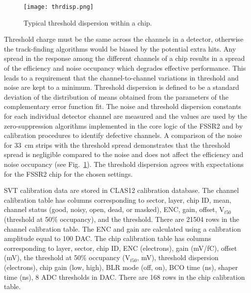 \begin{figure}[hbt] 
	\centering 
	\texttt{[image: thrdisp.png]}
	\caption{Typical threshold dispersion within a chip.}
	\label{fig:thrdisp}
\end{figure}

Threshold charge must be the same across the channels in a detector, otherwise the track-finding algorithms would be biased by the potential extra hits. Any spread in the response among the different channels of a chip results in a spread of the efficiency and noise occupancy which degrades effective performance. This leads to a requirement that the channel-to-channel variations in threshold and noise are kept to a minimum. Threshold dispersion is defined to be a standard deviation of the distribution of means obtained from the parameters of the complementary error function fit. The noise and threshold dispersion constants for each individual detector channel are measured and the values are used by the zero-suppression algorithms implemented in the core logic of the FSSR2 and by calibration procedures to identify defective channels. A comparison of the noise for 33~cm strips with the threshold spread demonstrates that the threshold spread is negligible compared to the noise and does not affect the efficiency and noise occupancy (see Fig.~\ref{fig:thrdisp}). The threshold dispersion agrees with expectations for the FSSR2 chip for the chosen settings.

SVT calibration data are stored in CLAS12 calibration database. The channel calibration table has columns corresponding to sector, layer, chip ID, mean, channel status (good, noisy, open, dead, or masked), ENC, gain, offset, V$_{t50}$ (threshold at 50$\%$ occupancy), and the threshold. There are 21504 rows in the channel calibration table. The ENC and gain are calculated using a calibration amplitude equal to 100 DAC.
The chip calibration table has columns corresponding to layer, sector, chip ID, ENC (electrons), gain (mV/fC), offset (mV), the threshold at 50$\%$ occupancy (V$_{t50}$, mV), threshold dispersion (electrons), chip gain (low, high), BLR mode (off, on), BCO time (ns), shaper time (ns), 8 ADC thresholds in DAC. There are 168 rows in the chip calibration table. 

